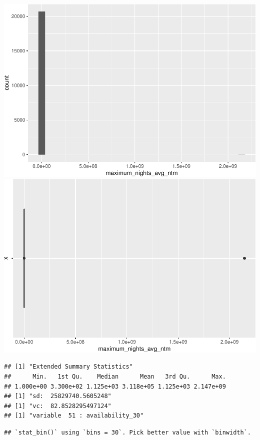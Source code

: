 \includegraphics{anal_files/figure-latex/unnamed-chunk-9-26.pdf}
\includegraphics{anal_files/figure-latex/unnamed-chunk-9-27.pdf}

\begin{verbatim}
## [1] "Extended Summary Statistics"
##      Min.   1st Qu.    Median      Mean   3rd Qu.      Max. 
## 1.000e+00 3.300e+02 1.125e+03 3.118e+05 1.125e+03 2.147e+09 
## [1] "sd:  25829740.5605248"
## [1] "vc:  82.8528295497124"
## [1] "variable  51 : availability_30"
\end{verbatim}

\begin{verbatim}
## `stat_bin()` using `bins = 30`. Pick better value with `binwidth`.
\end{verbatim}

